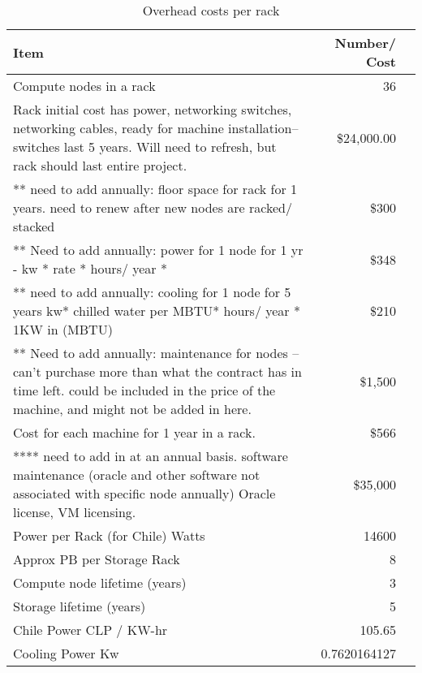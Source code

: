 \tiny \begin{longtable} { |p{}  |r  |r |} 
\caption{Overhead costs per rack \label{tab:overheads}}\\ 
\hline 
\textbf{Item}&\textbf{Number/ Cost} \\ \hline
{Compute nodes in a rack }&{36} \\ \hline
{Rack initial cost has power, networking switches, networking cables, ready for machine installation-- switches last 5 years.  Will need to refresh, but rack should last entire project.  }&{\$24,000.00} \\ \hline
{ ** need to add annually: floor space for rack for 1 years.   need to renew after new nodes are racked/ stacked }&{\$300} \\ \hline
{** Need to add annually: power for 1 node for 1 yr - kw * rate * hours/ year * }&{\$348} \\ \hline
{** need to add annually: cooling for 1 node for 5 years  kw* chilled water per MBTU* hours/ year *  1KW in (MBTU) }&{\$210} \\ \hline
{** Need to add annually: maintenance for nodes -- can't purchase more than what the contract has in time left.  could be included in the price of the machine, and might not be added in here.  }&{\$1,500} \\ \hline
{Cost for each machine for 1 year in a rack.   }&{\$566} \\ \hline
{**** need to add in at an annual basis.  software maintenance (oracle and other software not associated with specific node annually)  Oracle license, VM licensing.  }&{\$35,000} \\ \hline
{Power per Rack (for Chile) Watts}&{14600} \\ \hline
{Approx PB per Storage Rack }&{8} \\ \hline
{Compute node lifetime (years)}&{3} \\ \hline
{Storage lifetime (years)}&{5} \\ \hline
{Chile Power CLP /  KW-hr
}&{105.65} \\ \hline
{Cooling Power Kw}&{0.7620164127} \\ \hline
\end{longtable} \normalsize
